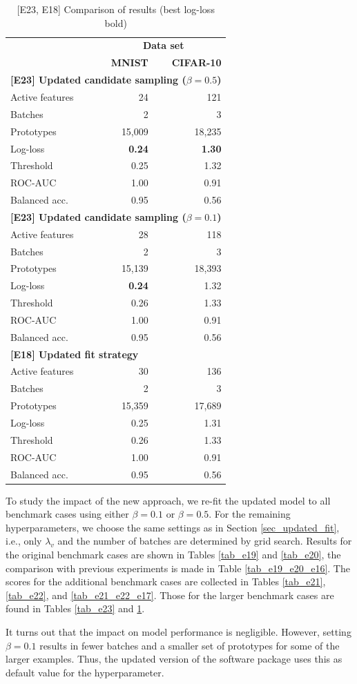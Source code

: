 %
\begin{table}
\caption{[E23, E18] Comparison of results (best log-loss bold)}
\label{tab_e23_e18}
%
\begin{center}
\small
\begin{tabular}{|lrr|}
\hline
&\multicolumn{2}{c|}{\textbf{\hrulefill\ Data set \hrulefill}}\\
&\textbf{MNIST}&\textbf{CIFAR-10}\\
\multicolumn{3}{|l|}{\textbf{[E23]  Updated candidate sampling ($\beta=0.5$)}}\\
Active features&24&121\\
Batches&2&3\\
Prototypes&15,009&18,235\\
Log-loss&\textbf{0.24}&\textbf{1.30}\\
Threshold&0.25&1.32\\
ROC-AUC&1.00&0.91\\
Balanced acc.&0.95&0.56\\
\multicolumn{3}{|l|}{\textbf{[E23]  Updated candidate sampling ($\beta=0.1$)}}\\
Active features&28&118\\
Batches&2&3\\
Prototypes&15,139&18,393\\
Log-loss&\textbf{0.24}&1.32\\
Threshold&0.26&1.33\\
ROC-AUC&1.00&0.91\\
Balanced acc.&0.95&0.56\\
\multicolumn{3}{|l|}{\textbf{[E18] Updated fit strategy}}\\
Active features&30&136\\
Batches&2&3\\
Prototypes&15,359&17,689\\
Log-loss&0.25&1.31\\
Threshold&0.26&1.33\\
ROC-AUC&1.00&0.91\\
Balanced acc.&0.95&0.56\\
\hline
\end{tabular}
\end{center}
\end{table}
%
To study the impact of the new approach, we re-fit the updated model to all benchmark cases using either $\beta=0.1$ or $\beta=0.5$.
For the remaining hyperparameters, we choose the same settings as in Section \ref{sec_updated_fit}, i.e., only $\lambda_v$ and the number of batches are determined by grid search.
Results for the original benchmark cases are shown in Tables \ref{tab_e19} and \ref{tab_e20}, the comparison with previous experiments is made in Table \ref{tab_e19_e20_e16}.
The scores for the additional benchmark cases are collected in Tables \ref{tab_e21}, \ref{tab_e22}, and \ref{tab_e21_e22_e17}.
Those for the larger benchmark cases are found in Tables \ref{tab_e23} and \ref{tab_e23_e18}.\par
%
It turns out that the impact on model performance is negligible.
However, setting $\beta=0.1$ results in fewer batches and a smaller set of prototypes for some of the larger examples.
Thus, the updated version of the software package uses this as default value for the hyperparameter.
\endinput
